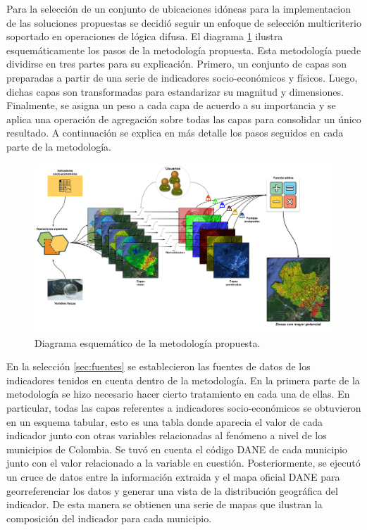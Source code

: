 Para la selección de un conjunto de ubicaciones idóneas para la implementacion de las soluciones propuestas se decidió seguir un enfoque de selección 
multicriterio soportado en operaciones de lógica difusa.  El diagrama \ref{fig:plan} ilustra esquemáticamente los pasos de la metodología propuesta.  Esta 
metodología puede dividirse en tres partes para su explicación.  Primero, un conjunto de capas son preparadas a partir de una serie de indicadores 
socio-económicos y físicos. Luego, dichas capas son transformadas para estandarizar su magnitud y dimensiones.  Finalmente, se asigna un peso a cada capa de 
acuerdo a su importancia y  se aplica una operación de agregación sobre todas las capas para consolidar un único resultado.  A continuación se explica en más 
detalle los pasos seguidos en cada parte de la metodología.

\begin{figure}[h!]
    \centering
    \includegraphics[width=1\textwidth]{figures/plan}
    \caption{Diagrama esquemático de la metodología propuesta.}
    \label{fig:plan}
\end{figure}

En la selección \ref{sec:fuentes} se establecieron las fuentes de datos de los indicadores tenidos en cuenta dentro de la metodología.  En la primera parte 
de la metodología se hizo necesario hacer cierto tratamiento en cada una de ellas.  En particular, todas las capas referentes a indicadores socio-económicos 
se obtuvieron en un esquema tabular, esto es una tabla donde aparecia el valor de cada indicador junto con otras variables relacionadas al fenómeno a nivel de 
los municipios de Colombia.  Se tuvó en cuenta el código DANE de cada municipio junto con el valor relacionado a la variable en cuestión.  
Posteriormente, se ejecutó un cruce de datos entre la información extraida y el mapa oficial DANE para georreferenciar los datos y generar una vista de la 
distribución geográfica del indicador.  De esta manera se obtienen una serie de mapas que ilustran la composición del indicador para cada municipio.

